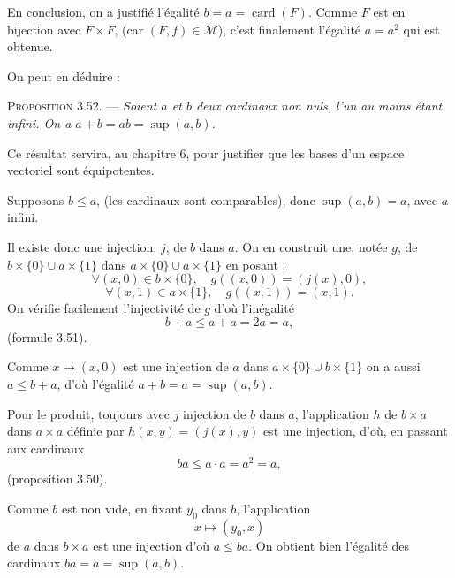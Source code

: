 En conclusion, on a justifié l'égalité $b=a=\operatorname{card}(F)$. Comme $F$ est en bijection avec $F\times F$, (car $(F,f)\in\mathcal M$), c'est finalement l'égalité $a=a^2$ qui est obtenue.

On peut en déduire :

\medskip\noindent\textsc{Proposition 3.52.} --- \emph{Soient $a$ et $b$ deux cardinaux non nuls, l'un au moins étant infini. On a $a+b=ab=\sup(a,b)$.}

Ce résultat servira, au chapitre 6, pour justifier que les bases d'un espace vectoriel sont équipotentes.

Supposons $b\le a$, (les cardinaux sont comparables), donc $\sup(a,b)=a$, avec $a$ infini.

Il existe donc une injection, $j$, de $b$ dans $a$. On en construit une, notée $g$, de $b\times\{0\}\cup a\times\{1\}$ dans $a\times\{0\}\cup a\times\{1\}$ en posant :
\[
\forall(x,0)\in b\times\{0\},\quad g((x,0))=(j(x),0),
\]
\[
\forall(x,1)\in a\times\{1\},\quad g((x,1))=(x,1).
\]
On vérifie facilement l'injectivité de $g$ d'où l'inégalité
\[
b+a\le a+a=2a=a,
\]
(formule 3.51).

Comme $x\mapsto(x,0)$ est une injection de $a$ dans $a\times\{0\}\cup b\times\{1\}$ on a aussi $a\le b+a$, d'où l'égalité $a+b=a=\sup(a,b)$.

Pour le produit, toujours avec $j$ injection de $b$ dans $a$, l'application $h$ de $b\times a$ dans $a\times a$ définie par $h(x,y)=(j(x),y)$ est une injection, d'où, en passant aux cardinaux
\[
ba\le a\cdot a=a^2=a,
\]
(proposition 3.50).

Comme $b$ est non vide, en fixant $y_0$ dans $b$, l'application
\[
x\longmapsto(y_0,x)
\]
de $a$ dans $b\times a$ est une injection d'où $a\le ba$. On obtient bien l'égalité des cardinaux $ba=a=\sup(a,b)$. \bookend


